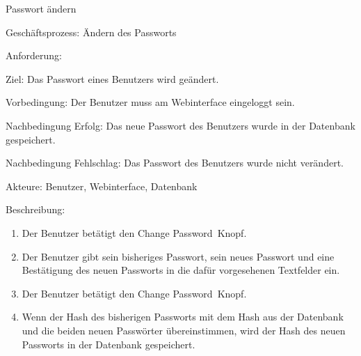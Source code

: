 \begin{function}{80}{Passwort ändern}
\item[Geschäftsprozess:] Ändern des Passworts
\item[Anforderung:] 
\item[Ziel:] Das Passwort eines Benutzers wird geändert.
\item[Vorbedingung:] Der Benutzer muss am Webinterface eingeloggt sein.
\item[Nachbedingung Erfolg:] Das neue Passwort des Benutzers wurde in der Datenbank gespeichert.
\item[Nachbedingung Fehlschlag:] Das Passwort des Benutzers wurde nicht verändert.
\item[Akteure:] Benutzer, Webinterface, Datenbank
\item[Beschreibung:] ~
\begin{enumerate}
\item Der Benutzer betätigt den \glqq Change Password\grqq\ Knopf.
\item Der Benutzer gibt sein bisheriges Passwort, sein neues Passwort und eine Bestätigung des neuen Passworts in die dafür vorgesehenen Textfelder ein.
\item Der Benutzer betätigt den \glqq Change Password\grqq\ Knopf.
\item Wenn der Hash des bisherigen Passworts mit dem Hash aus der Datenbank und die beiden neuen Passwörter übereinstimmen, wird der Hash des neuen Passworts in der Datenbank gespeichert.
\end{enumerate}
\end{function} ~

